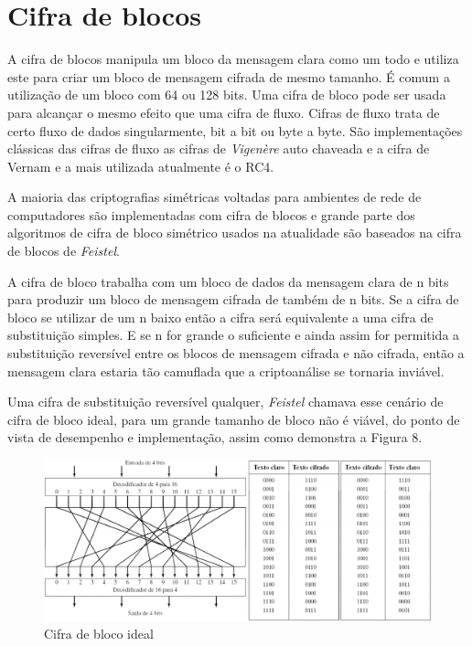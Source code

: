 \section{Cifra de blocos}
\label{sec:cifradeblocos}
A cifra de blocos manipula um bloco da mensagem clara como um todo e utiliza este para criar um bloco de mensagem cifrada de mesmo tamanho. É comum a utilização de um bloco com 64 ou 128 bits. Uma cifra de bloco pode ser usada para alcançar o mesmo efeito que uma cifra de fluxo. Cifras de fluxo trata de certo fluxo de dados singularmente, bit a bit ou byte a byte. São implementações clássicas das cifras de fluxo as cifras de \textit{Vigenère} auto chaveada e a cifra de Vernam e a mais utilizada atualmente é o RC4.

A maioria das criptografias simétricas voltadas para ambientes de rede de computadores são implementadas com cifra de blocos e grande parte dos algoritmos de cifra de bloco simétrico usados na atualidade são baseados na cifra de blocos de \textit{Feistel}.

A cifra de bloco trabalha com um bloco de dados da mensagem clara de n bits para produzir um bloco de mensagem cifrada de também de n bits. Se a cifra de bloco se utilizar de um n baixo então a cifra será equivalente a uma cifra de substituição simples. E se n for grande o suficiente e ainda assim for permitida a substituição reversível entre os blocos de mensagem cifrada e não cifrada, então a mensagem clara estaria tão camuflada que a criptoanálise se tornaria inviável.

Uma cifra de substituição reversível qualquer, \textit{Feistel} chamava esse cenário de cifra de bloco ideal, para um grande tamanho de bloco não é viável, do ponto de vista de desempenho e implementação, assim como demonstra a Figura 8.

\begin{figure}[H]
    \centering
    \caption{Cifra de bloco ideal}
    \includegraphics[width=.8\linewidth]{Figuras/CifraDeBloco.png}
\end{figure}

